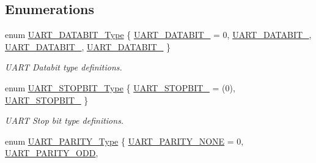 \subsection*{\-Enumerations}
\begin{DoxyCompactItemize}
\item 
enum \hyperlink{group___u_a_r_t___public___types_ga2b8c6f7ae8c1ff3557b3c9b67be69648}{\-U\-A\-R\-T\-\_\-\-D\-A\-T\-A\-B\-I\-T\-\_\-\-Type} \{ \hyperlink{group___u_a_r_t___public___types_gga2b8c6f7ae8c1ff3557b3c9b67be69648ab8edf3c4ac9cd19a77a78046c8d7c21d}{\-U\-A\-R\-T\-\_\-\-D\-A\-T\-A\-B\-I\-T\-\_} =  0, 
\hyperlink{group___u_a_r_t___public___types_gga2b8c6f7ae8c1ff3557b3c9b67be69648a28d637fedc642319e85aa69ee7460143}{\-U\-A\-R\-T\-\_\-\-D\-A\-T\-A\-B\-I\-T\-\_}, 
\hyperlink{group___u_a_r_t___public___types_gga2b8c6f7ae8c1ff3557b3c9b67be69648a64eeea6c1646790ebd4acc2557aaf393}{\-U\-A\-R\-T\-\_\-\-D\-A\-T\-A\-B\-I\-T\-\_}, 
\hyperlink{group___u_a_r_t___public___types_gga2b8c6f7ae8c1ff3557b3c9b67be69648a5a1857edfe041a41ef5e7f098be8ead2}{\-U\-A\-R\-T\-\_\-\-D\-A\-T\-A\-B\-I\-T\-\_}
 \}
\begin{DoxyCompactList}\small\item\em \-U\-A\-R\-T \-Databit type definitions. \end{DoxyCompactList}\item 
enum \hyperlink{group___u_a_r_t___public___types_gaa539c23e185a76d77b3c9efc3d62b68c}{\-U\-A\-R\-T\-\_\-\-S\-T\-O\-P\-B\-I\-T\-\_\-\-Type} \{ \hyperlink{group___u_a_r_t___public___types_ggaa539c23e185a76d77b3c9efc3d62b68cab9c26fe02b2f4407d7106ea4da1f74ab}{\-U\-A\-R\-T\-\_\-\-S\-T\-O\-P\-B\-I\-T\-\_} =  (0), 
\hyperlink{group___u_a_r_t___public___types_ggaa539c23e185a76d77b3c9efc3d62b68cacdc53828459d69a364db0fc85c4dd7b1}{\-U\-A\-R\-T\-\_\-\-S\-T\-O\-P\-B\-I\-T\-\_}
 \}
\begin{DoxyCompactList}\small\item\em \-U\-A\-R\-T \-Stop bit type definitions. \end{DoxyCompactList}\item 
enum \hyperlink{group___u_a_r_t___public___types_ga66fa9d836eb6f7035939427e6f8cc318}{\-U\-A\-R\-T\-\_\-\-P\-A\-R\-I\-T\-Y\-\_\-\-Type} \{ \*
\hyperlink{group___u_a_r_t___public___types_gga66fa9d836eb6f7035939427e6f8cc318aa80d2d8ea61454045ebe71d155e85b3d}{\-U\-A\-R\-T\-\_\-\-P\-A\-R\-I\-T\-Y\-\_\-\-N\-O\-N\-E} =  0, 
\hyperlink{group___u_a_r_t___public___types_gga66fa9d836eb6f7035939427e6f8cc318ad90cc425f5ba447773a44a75be6593e2}{\-U\-A\-R\-T\-\_\-\-P\-A\-R\-I\-T\-Y\-\_\-\-O\-D\-D}, 

\end{DoxyCompactItemize}
